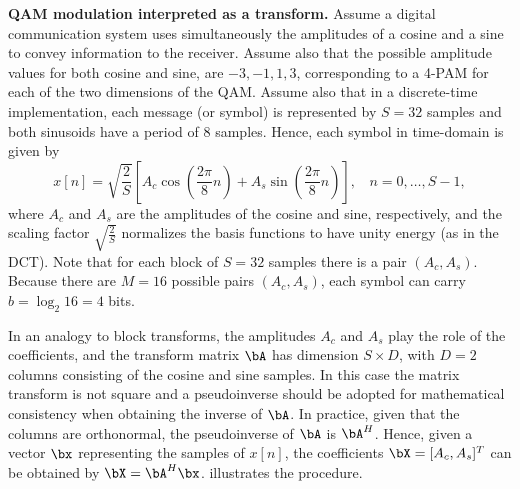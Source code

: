 \bExample \textbf{QAM modulation interpreted as a transform.}
Assume a digital communication system uses simultaneously the amplitudes of a cosine and a sine to convey information to the receiver. Assume also that the possible amplitude values for both cosine and sine, are $-3,-1,1,3$, corresponding to a 4-PAM for each of the two dimensions of the QAM. 
Assume also that in a discrete-time implementation, each message (or symbol) is represented by $S=32$ samples and both sinusoids have a period of 8 samples. Hence, each symbol in time-domain is given by
\[
x[n] = \sqrt{\frac{2}{S}} \left[A_c \cos \left( \frac{2 \pi}{8} n\right) + A_s \sin \left( \frac{2 \pi}{8} n\right) \right],~~~~n=0,\ldots,S-1,
\]
where $A_c$ and $A_s$ are the amplitudes of the cosine and sine, respectively, and the scaling factor $\sqrt{\frac{2}{S}}$ normalizes the basis functions to have unity energy (as in the DCT).
Note that for each block of $S=32$ samples there is a pair $(A_c,A_s)$. Because there are $M=16$ possible pairs $(A_c,A_s)$, each symbol can carry $b=\log_2 16 = 4$ bits.

In an analogy to block transforms, the amplitudes $A_c$ and $A_s$ play the role of the coefficients, and the transform matrix $\bA$ has dimension $S \times D$, with $D=2$ columns consisting of the cosine and sine samples. In this case the matrix transform is not square and a pseudoinverse should be adopted for mathematical consistency when obtaining the inverse of $\bA$. In practice, given that the columns are orthonormal, the pseudoinverse of $\bA$ is $\bA^H$. Hence, given a vector $\bx$ representing the samples of $x[n]$, the coefficients $\bX=[A_c,A_s]^T$ can be obtained by $\bX = \bA^H \bx$.  illustrates the procedure.


